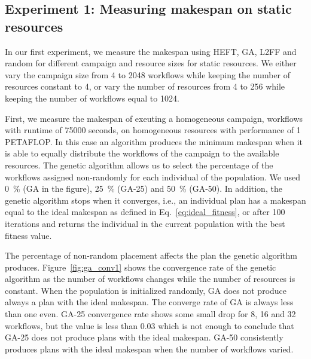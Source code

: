\subsection{Experiment 1: Measuring makespan on static resources}

In our first experiment, we measure the makespan using HEFT, GA, L2FF and random for different campaign and resource sizes for static resources.
We either vary the campaign size from 4 to 2048 workflows while keeping the number of resources constant to 4, or vary the number of resources from 4 to 256 while keeping the number of workflows equal to 1024.

First, we measure the makespan of exeuting a homogeneous campaign, workflows with runtime of 75000 seconds,  on homogeneous resources with performance of 1 PETAFLOP.
In this case an algorithm produces the minimum makespan when it is able to equally distribute the workflows of the campaign to the available resources.
The genetic algorithm allows us to select the percentage of the workflows assigned non-randomly for each individual of the population.
We used 0~\% (GA in the figure), 25~\% (GA-25) and 50~\% (GA-50).
In addition, the genetic algorithm stops when it converges, i.e., an individual plan has a makespan equal to the ideal makespan as defined in Eq.~\ref{eq:ideal_fitness}, or after 100 iterations and returns the individual in the current population with the best fitness value.

The percentage of non-random placement affects the plan the genetic algorithm produces.
Figure~\ref{fig:ga_conv1} shows the convergence rate of the genetic algorithm as the number of workflows changes while the number of resources is constant.
When the population is initialized randomly, GA does not produce always a plan with the ideal makespan.
The converge rate of GA is always less than one even.
GA-25 convergence rate shows some small drop for 8, 16 and 32 workflows, but the value is less than 0.03 which is not enough to conclude that GA-25 does not produce plans with the ideal makespan.
GA-50 consistently produces plans with the ideal makespan when the number of workflows varied.

